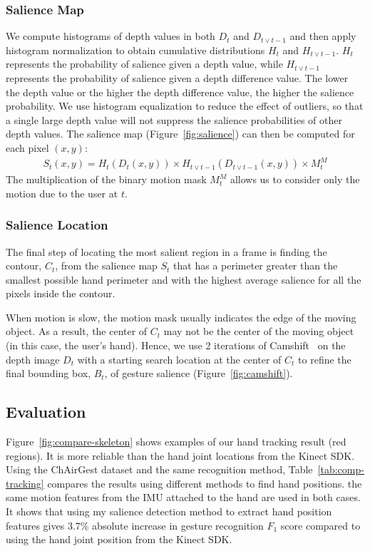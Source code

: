 \subsubsection{Salience Map}
We compute histograms of depth values in both $D_t$ and $D_{t\vee t-1}$ and then apply histogram normalization to obtain cumulative distributions $H_t$ and $H_{t\vee t-1}$.
$H_t$ represents the probability of salience given a depth value, while $H_{t\vee t-1}$ represents the probability of salience given
a depth difference value. The lower the depth value or the higher the depth difference value, the higher the salience probability. We use
histogram equalization to reduce the effect of outliers, so that a single large depth value will not suppress the salience probabilities of other depth values.
The salience map (Figure~\ref{fig:salience}) can then be computed for each pixel $(x, y)$:
\begin{align*}
S_t(x, y) = H_t(D_t(x, y)) \times H_{t\vee t-1}(D_{t\vee t-1}(x, y)) \times M_t^M
\end{align*}
The multiplication of the binary motion mask $M_t^M$ allows us to consider only the motion due to the user at $t$.

\subsubsection{Salience Location}
The final step of locating the most salient region in a frame is finding the
contour, $C_t$, from the salience map $S_t$ that has a perimeter greater than
the smallest possible hand perimeter and with the highest average salience for all the pixels inside the contour.

When motion is slow, the motion mask usually indicates the edge of the moving
object. As a result, the center of $C_t$ may not be the center of the moving
object (in this case, the user's hand). Hence, we use 2 iterations of
Camshift~\cite{bradski98} on the depth image $D_t$ with a starting search location at the center of $C_t$ to refine
the final bounding box, $B_t$, of gesture salience (Figure~\ref{fig:camshift}).

\subsection{Evaluation}
Figure~\ref{fig:compare-skeleton} shows examples of our hand tracking result (red regions).
It is more reliable than the hand joint locations from the Kinect SDK. Using the
ChAirGest dataset and the same recognition method, Table~\ref{tab:comp-tracking}
compares the results using different methods to find hand positions. the same
motion features from the IMU attached to the hand are used in both cases. It
shows that using my salience detection method to extract hand position features gives 3.7\% absolute increase in gesture recognition $F_1$ score compared to using the hand joint position from the Kinect SDK.

